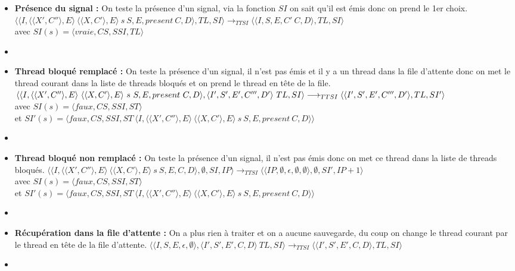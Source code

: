\documentclass[10pt,a4paper]{article}
\begin{document}
\begin{enumerate}
\begin{itemize}
						\item[] \textbf{Présence du signal :} On teste la présence d'un signal, via la fonction $SI$ on sait qu'il est émis donc on prend le 1er choix.
						\smallbreak
						$\langle\langle I,\langle\langle X',C''\rangle,E\rangle~\langle\langle X,C'\rangle,E\rangle~s~S,E,present~C,D\rangle,TL,SI\rangle 
						\longrightarrow_{TTSI} 
						\langle\langle I,S,E,C'~C,D\rangle,TL,SI\rangle$ 
						\\avec $SI(s) = \langle vraie,CS,SSI,TL\rangle$
						\item[]
						\newpage
						
						
						
						\item[] \textbf{ Thread bloqué remplacé :} On teste la présence d'un signal, il n'est pas émis et il y a un thread dans la file d'attente donc on met le thread courant dans la liste de threads bloqués et on prend le thread en tête de la file.
						\smallbreak
						$\langle\langle I,\langle\langle X',C''\rangle,E\rangle~\langle\langle X,C'\rangle,E\rangle~s~S,E,present~C,D\rangle,\langle I',S',E',C''',D'\rangle~TL,SI\rangle 
						\\\longrightarrow_{TTSI} 
						\langle\langle I',S',E',C''',D'\rangle,TL,SI'\rangle$ 
						\\avec $SI(s) = \langle faux,CS,SSI,ST\rangle$
						\\et $SI'(s) = \langle faux,CS,SSI,ST~\langle I,\langle\langle X',C''\rangle,E\rangle~\langle\langle X,C'\rangle,E\rangle~s~S,E,present~C,D\rangle\rangle$
						\item[]	
						
						\item[] \textbf{Thread bloqué non remplacé :} On teste la présence d'un signal, il n'est pas émis donc on met ce thread dans la liste de threads bloqués.
						\smallbreak 
						$\langle\langle I,\langle\langle X',C''\rangle,E\rangle~\langle\langle X,C'\rangle,E\rangle~s~S,E,C,D\rangle,\emptyset,SI,IP\rangle 
						\longrightarrow_{TTSI} 
						\langle\langle IP,\emptyset,\epsilon,\emptyset,\emptyset\rangle,\emptyset,SI',IP+1\rangle$
						\\avec $SI(s) = \langle faux,CS,SSI,ST\rangle$
						\\et $SI'(s) = \langle faux,CS,SSI,ST~\langle I,\langle\langle X',C''\rangle,E\rangle~\langle\langle X,C'\rangle,E\rangle~s~S,E,present~C,D\rangle\rangle$
						\item[]
						
						\item[] \textbf{Récupération dans la file d'attente :} On a plus rien à traiter et on a aucune sauvegarde, du coup on change le thread courant par le thread en tête de la file d'attente.
						\smallbreak
						$\langle\langle I,S,E,\epsilon,\emptyset\rangle,\langle I',S',E',C,D\rangle~TL,SI\rangle 
						\longrightarrow_{TTSI} 
						\langle\langle I',S',E',C,D\rangle,TL,SI\rangle$
						\item[]
						

\end{itemize}
\end{enumerate}
\end{document}
